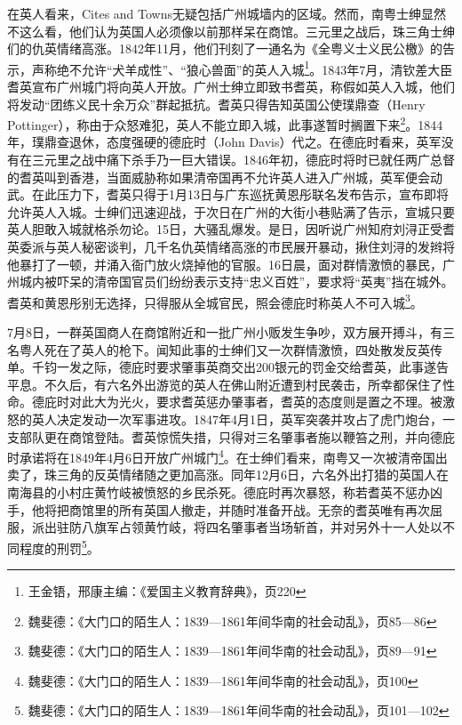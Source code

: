 在英人看来，Cites and Towns无疑包括广州城墙内的区域。然而，南粤士绅显然不这么看，他们认为英国人必须像以前那样呆在商馆。三元里之战后，珠三角士绅们的仇英情绪高涨。1842年11月，他们刊刻了一通名为《全粤义士义民公檄》的告示，声称绝不允许“犬羊成性”、“狼心兽面”的英人入城\footnote{王金铻，邢康主编：《爱国主义教育辞典》，页220}。1843年7月，清钦差大臣耆英宣布广州城门将向英人开放。广州士绅立即致书耆英，称假如英人入城，他们将发动“团练义民十余万众”群起抵抗。耆英只得告知英国公使璞鼎查（Henry Pottinger），称由于众怒难犯，英人不能立即入城，此事遂暂时搁置下来\footnote{魏斐德：《大门口的陌生人：1839—1861年间华南的社会动乱》，页85—86}。1844年，璞鼎查退休，态度强硬的德庇时（John Davis）代之。在德庇时看来，英军没有在三元里之战中痛下杀手乃一巨大错误。1846年初，德庇时将时已就任两广总督的耆英叫到香港，当面威胁称如果清帝国再不允许英人进入广州城，英军便会动武。在此压力下，耆英只得于1月13日与广东巡抚黄恩彤联名发布告示，宣布即将允许英人入城。士绅们迅速迎战，于次日在广州的大街小巷贴满了告示，宣城只要英人胆敢入城就格杀勿论。15日，大骚乱爆发。是日，因听说广州知府刘浔正受耆英委派与英人秘密谈判，几千名仇英情绪高涨的市民展开暴动，揪住刘浔的发辫将他暴打了一顿，并涌入衙门放火烧掉他的官服。16日晨，面对群情激愤的暴民，广州城内被吓呆的清帝国官员们纷纷表示支持“忠义百姓”，要求将“英夷”挡在城外。耆英和黄恩彤别无选择，只得服从全城官民，照会德庇时称英人不可入城\footnote{魏斐德：《大门口的陌生人：1839—1861年间华南的社会动乱》，页89—91}。

7月8日，一群英国商人在商馆附近和一批广州小贩发生争吵，双方展开搏斗，有三名粤人死在了英人的枪下。闻知此事的士绅们又一次群情激愤，四处散发反英传单。千钧一发之际，德庇时要求肇事英商交出200银元的罚金交给耆英，此事遂告平息。不久后，有六名外出游览的英人在佛山附近遭到村民袭击，所幸都保住了性命。德庇时对此大为光火，要求耆英惩办肇事者，耆英的态度则是置之不理。被激怒的英人决定发动一次军事进攻。1847年4月1日，英军突袭并攻占了虎门炮台，一支部队更在商馆登陆。耆英惊慌失措，只得对三名肇事者施以鞭笞之刑，并向德庇时承诺将在1849年4月6日开放广州城门\footnote{魏斐德：《大门口的陌生人：1839—1861年间华南的社会动乱》，页100}。在士绅们看来，南粤又一次被清帝国出卖了，珠三角的反英情绪随之更加高涨。同年12月6日，六名外出打猎的英国人在南海县的小村庄黄竹岐被愤怒的乡民杀死。德庇时再次暴怒，称若耆英不惩办凶手，他将把商馆里的所有英国人撤走，并随时准备开战。无奈的耆英唯有再次屈服，派出驻防八旗军占领黄竹岐，将四名肇事者当场斩首，并对另外十一人处以不同程度的刑罚\footnote{魏斐德：《大门口的陌生人：1839—1861年间华南的社会动乱》，页101—102}。

